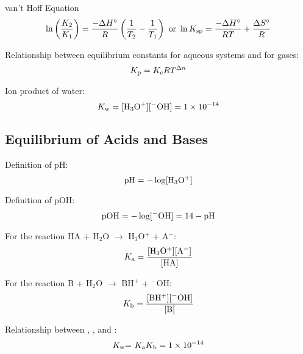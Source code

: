 \documentclass[10pt]{article}
\begin{document}
van't Hoff Equation
\begin{equation*}
\ln \left(\frac{K_2}{K_1}\right) = \frac{-\Delta H^\circ}{R}\left(\frac{1}{T_2}-\frac{1}{T_1}\right) \textnormal{ or } \ln K_\textnormal{sp} = \frac{-\Delta H^{\circ}}{RT} + \frac{\Delta S^{\circ}}{R}
\end{equation*}

Relationship between equilibrium constants for aqueous systems and for gases:
\begin{equation*}
K_\textnormal{p} = K_\textnormal{c}RT^{\Delta n}
\end{equation*}

Ion product of water:
\begin{equation*}
K_\textnormal{w} = [\textnormal{H$_3$O$^{+}$}][\textnormal{$^{-}$OH}] = \num{1e-14}
\end{equation*}


\subsection{Equilibrium of Acids and Bases}

Definition of pH:
\begin{equation*}
\textnormal{pH} = -\log[\textnormal{H$_3$O$^{+}$}]
\end{equation*}

Definition of pOH:
\begin{equation*}
\textnormal{pOH} = -\log[\textnormal{$^{-}$OH}] = 14-\textnormal{pH}
\end{equation*}

For the reaction HA + H$_2$O $\longrightarrow$ H$_3$O$^{+}$ + A$^{-}$:
\begin{equation*}
\textnormal{$K_{\textnormal{a}}$} = \frac{[\textnormal{H$_3$O$^{+}$}][\textnormal{A$^{-}$}]}{[\textnormal{HA}]}
\end{equation*}

For the reaction B + H$_2$O $\longrightarrow$ BH$^{+}$ + $^{-}$OH:
\begin{equation*}
\textnormal{$K_{\textnormal{b}}$} = \frac{\textnormal{[BH$^{+}$][$^{-}$OH]}}{\textnormal{[B]}}
\end{equation*}

Relationship between \Ka, \Kb, and \Kw:
\begin{equation*}
\textnormal{$K_{\textnormal{w}}$= $K_{\textnormal{a}}$$K_{\textnormal{b}}$} = \num{1e-14}
\end{equation*}
\end{document}
